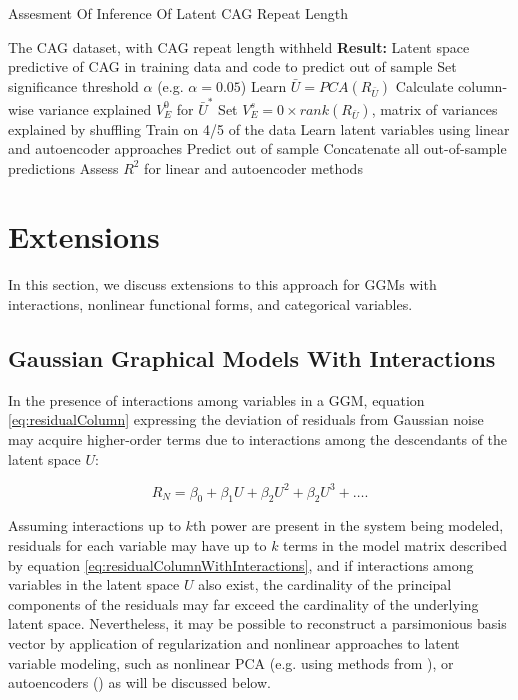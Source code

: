 \documentclass{article}
\begin{document}
\begin{algorithm}%
 \caption{Assesment Of Inference Of Latent CAG Repeat Length}
 \label{alg:cag}
\begin{algorithmic}
 The CAG dataset, with CAG repeat length withheld
\STATE \textbf{Result:} Latent space predictive of CAG in training data and code to predict out of sample
 \STATE Set significance threshold $\alpha$ (e.g. $\alpha = 0.05$)\;
 \STATE Learn $\bar{U} = PCA(R_{\bar{U}})$\;
 \STATE Calculate column-wise variance explained $V_E^{0}$ for $\bar{U}^{*}$\;
 \STATE Set $V_E^s = 0 \times rank(R_{\bar{U}})$, matrix of variances explained by shuffling\;
  \STATE Train on 4/5 of the data
  \STATE Learn latent variables using linear and autoencoder approaches
  \STATE Predict out of sample
  \STATE Concatenate all out-of-sample predictions
 \ENDFOR
\STATE Assess $R^{2}$ for linear and autoencoder methods
\end{algorithmic}
\end{algorithm}


\section{Extensions}
In this section, we discuss extensions to this approach for GGMs with interactions, nonlinear functional forms, and categorical variables. 

\subsection{Gaussian Graphical Models With Interactions}
In the presence of interactions among variables in a GGM, equation \ref{eq:residualColumn} expressing the deviation of residuals from Gaussian noise may acquire higher-order terms due to interactions among the descendants of the latent space $U$:

\begin{equation}
R_N = \beta_0 + \beta_1 U + \beta_2 U^2 + \beta_2 U^3 + \dots.
\label{eq:residualColumnWithInteractions}
\end{equation}

Assuming interactions up to $k$th power are present in the system being modeled, residuals for each variable may have up to $k$ terms in the model matrix described by equation \ref{eq:residualColumnWithInteractions}, and if interactions among variables in the latent space $U$ also exist, the cardinality of the principal components of the residuals may far exceed the cardinality of the underlying latent space.  Nevertheless, it may be possible to reconstruct a parsimonious basis vector by application of regularization and nonlinear approaches to latent variable modeling, such as nonlinear PCA (e.g. using methods from \cite{karatzoglou_kernlab_2004}), or autoencoders (\cite{louizos_causal_2017}) as will be discussed below.
\end{document}
